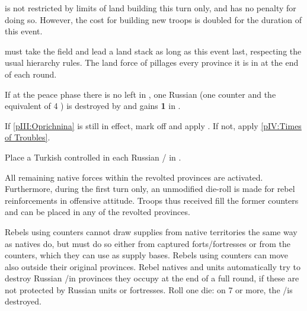 \phadm
\aparag \RUS is not restricted by limits of land building this turn only, and
has no penalty for doing so. %
However, the cost for building new troops is doubled for the duration of this
event.

\phmil
\aparag {} must take the field and lead a land stack as long
as this event last, respecting the usual hierarchy rules.
\aparag The land force of  pillages every province it is in
at the end of each round.

\phpaix
\aparag If at the peace phase there is no \REVOLT left in \RUS, one Russian
\ARMY (one counter and the equivalent of 4 \DT) is destroyed by \RUS and \RUS
gains {\bf 1} in \STAB.





\condition{}
\aparag If \ref{pIII:Oprichnina} is still in effect, mark off and apply \RD.
\aparag If not, apply \ref{pIV:Times of Troubles}.






\phevnt
\aparag Place a Turkish controlled \REVOLT \facemoins in each Russian \COL/\TP
in .

\phadm
\aparag All remaining native forces within the revolted provinces are
activated.
\aparag Furthermore, during the first turn only, an unmodified die-roll is
made for rebel reinforcements in offensive attitude. Troops thus received fill
the former \payssiberie counters and can be placed in any of the revolted
provinces.

\phmil
\aparag Rebels using \payssiberie counters cannot draw supplies from native
territories the same way as natives do, but must do so either from captured
forts/fortresses or from the \REVOLT counters, which they can use as supply
bases.
\aparag Rebels using \payssiberie counters can move also outside their
original provinces.
\aparag Rebel natives and \payssiberie units automatically try to destroy
Russian \COL/\TP in provinces they occupy at the end of a full round, if these
are not protected by Russian units or fortresses. Roll one die: on 7 or more,
the \COL/\TP is destroyed.

